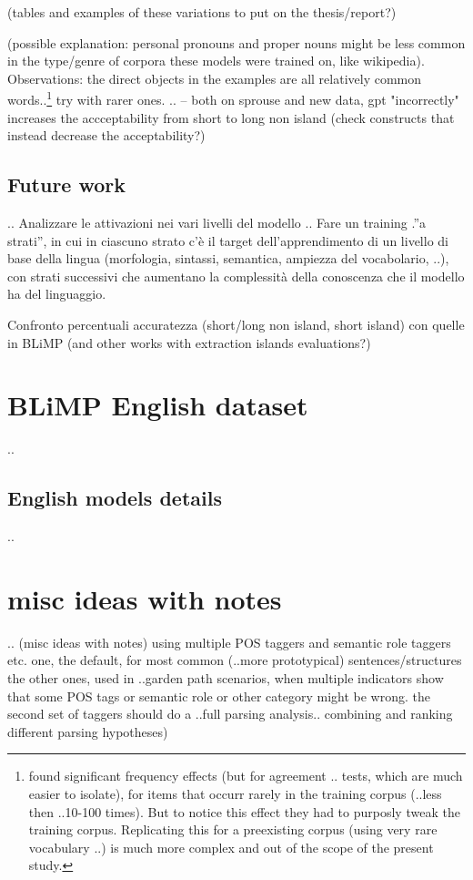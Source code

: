 (tables and examples of these variations to put on the thesis/report?)

(possible explanation: personal pronouns and proper nouns might be less common in the type/genre of corpora these models were trained on, like wikipedia).
Observations: the direct objects in the examples are all relatively common words..\footnote{\citet{wei2021frequency} found significant frequency effects (but for agreement .. tests, which are much easier to isolate), for items that occurr rarely in the training corpus (..less then ..10-100 times). But to notice this effect they had to purposly tweak the training corpus. Replicating this for a preexisting corpus (using very rare vocabulary ..) is much more complex and out of the scope of the present study.}
try with rarer ones.
..
-- both on sprouse and new data, gpt "incorrectly" increases the accceptability from short to long non island (check constructs that instead decrease the acceptability?)

\subsection{Future work}
..
Analizzare le attivazioni nei vari livelli del modello ..
Fare un training .”a strati”, in cui in ciascuno strato c’è il target dell’apprendimento di un livello di base della lingua (morfologia, sintassi, semantica, ampiezza del vocabolario, ..), con strati successivi che aumentano la complessità della conoscenza che il modello ha del linguaggio.


Confronto percentuali accuratezza (short/long non island, short island) con quelle in BLiMP
(and other works with extraction islands evaluations?)


\section{BLiMP English dataset}
..
\subsection{English models details}
..
\section{misc ideas with notes}

..
(misc ideas with notes)
using multiple POS taggers and semantic role taggers etc.
one, the default, for most common (..more prototypical) sentences/structures
the other ones, used in ..garden path scenarios, when multiple indicators show that some POS tags or semantic role or other category might be wrong.
the second set of taggers should do a ..full parsing analysis.. combining and ranking different parsing hypotheses)


